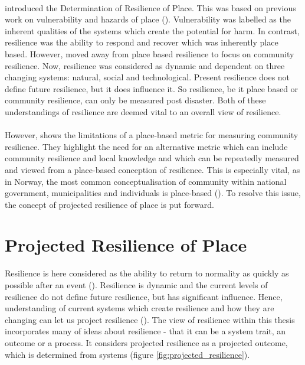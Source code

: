 \paragraph{}


\cite{cutter_place-based_2008} introduced the Determination of Resilience of Place. This was based on previous work on vulnerability and hazards of place (\cite{cutter_vulnerability_1996}).  Vulnerability was labelled as the inherent qualities of the systems which create the potential for harm. In contrast, resilience was the ability to respond and recover which was inherently place based. However, \cite{cutter_community_2020} moved away from place based resilience to focus on community resilience. Now, resilience was considered as dynamic and dependent on three changing systems: natural, social and technological. Present resilience does not define future resilience, but it does influence it. So resilience, be it place based or community resilience, can only be measured post disaster. Both of these understandings of resilience are deemed vital to an overall view of resilience.
\paragraph{}

However, \cite{rasanen_conceptualizing_2020} shows the limitations of a place-based metric for measuring community resilience. They highlight the need for an alternative metric which can include community resilience and local knowledge and which can be repeatedly measured and viewed from a place-based conception of resilience. This is especially vital, as in Norway, the most common conceptualisation of community within national government, municipalities and individuals is place-based (\cite{rasanen_conceptualizing_2020}). To resolve this issue, the concept of projected resilience of place is put forward. 




\section{Projected Resilience of Place} 
\label{theory-resilience}
Resilience is here considered as the ability to return to normality as quickly as possible after an event (\cite{cutter_place-based_2008}). Resilience is dynamic and the current levels of resilience do not define future resilience, but has significant influence. Hence, understanding of current systems which create resilience and how they are changing can let us project resilience (\cite{cutter_community_2020}). The view of resilience within this thesis incorporates many of \cite{moser_turbulent_2019} ideas about resilience -  that it can be a system trait, an outcome or a process. It considers projected resilience as a projected outcome, which is determined from systems (figure \ref{fig:projected_resilience}). 
